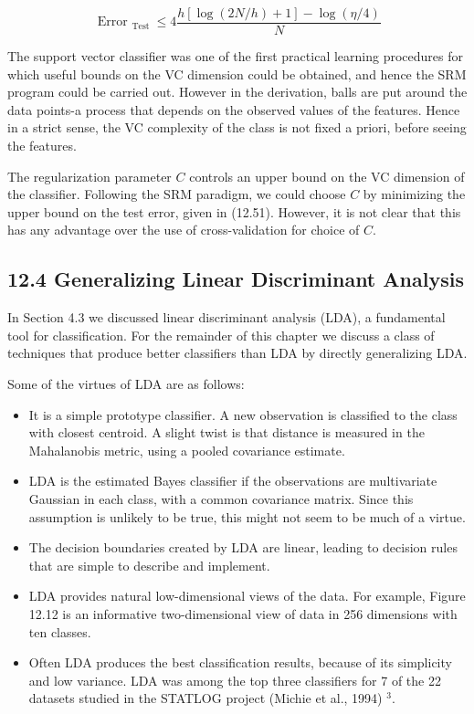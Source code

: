 \documentclass[10pt]{article}
\begin{document}
\begin{equation*}
\text { Error }_{\text {Test }} \leq 4 \frac{h[\log (2 N / h)+1]-\log (\eta / 4)}{N} \tag{12.51}
\end{equation*}


The support vector classifier was one of the first practical learning procedures for which useful bounds on the VC dimension could be obtained, and hence the SRM program could be carried out. However in the derivation, balls are put around the data points-a process that depends on the observed values of the features. Hence in a strict sense, the VC complexity of the class is not fixed a priori, before seeing the features.

The regularization parameter $C$ controls an upper bound on the VC dimension of the classifier. Following the SRM paradigm, we could choose $C$ by minimizing the upper bound on the test error, given in (12.51). However, it is not clear that this has any advantage over the use of cross-validation for choice of $C$.

\subsection*{12.4 Generalizing Linear Discriminant Analysis}
In Section 4.3 we discussed linear discriminant analysis (LDA), a fundamental tool for classification. For the remainder of this chapter we discuss a class of techniques that produce better classifiers than LDA by directly generalizing LDA.

Some of the virtues of LDA are as follows:

\begin{itemize}
  \item It is a simple prototype classifier. A new observation is classified to the class with closest centroid. A slight twist is that distance is measured in the Mahalanobis metric, using a pooled covariance estimate.
  \item LDA is the estimated Bayes classifier if the observations are multivariate Gaussian in each class, with a common covariance matrix. Since this assumption is unlikely to be true, this might not seem to be much of a virtue.
  \item The decision boundaries created by LDA are linear, leading to decision rules that are simple to describe and implement.
  \item LDA provides natural low-dimensional views of the data. For example, Figure 12.12 is an informative two-dimensional view of data in 256 dimensions with ten classes.
  \item Often LDA produces the best classification results, because of its simplicity and low variance. LDA was among the top three classifiers for 7 of the 22 datasets studied in the STATLOG project (Michie et al., 1994) ${ }^{3}$.
\end{itemize}
\end{document}
